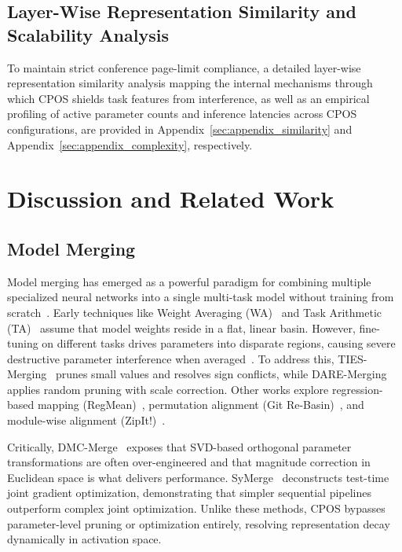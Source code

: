 \documentclass{article}
\theoremstyle{plain}
\theoremstyle{definition}
\theoremstyle{remark}
\begin{document}
\subsection{Layer-Wise Representation Similarity and Scalability Analysis}
\label{subsec:similarity_scalability_pointer}
To maintain strict conference page-limit compliance, a detailed layer-wise representation similarity analysis mapping the internal mechanisms through which CPOS shields task features from interference, as well as an empirical profiling of active parameter counts and inference latencies across CPOS configurations, are provided in Appendix~\ref{sec:appendix_similarity} and Appendix~\ref{sec:appendix_complexity}, respectively.

\section{Discussion and Related Work}
\label{sec:related}

\subsection{Model Merging}
Model merging has emerged as a powerful paradigm for combining multiple specialized neural networks into a single multi-task model without training from scratch~\cite{matena2022merging,ilharco2022editing}. Early techniques like Weight Averaging (WA)~\cite{izmailov2018averaging} and Task Arithmetic (TA)~\cite{ilharco2022editing} assume that model weights reside in a flat, linear basin. However, fine-tuning on different tasks drives parameters into disparate regions, causing severe destructive parameter interference when averaged~\cite{yadav2023resolving}. To address this, TIES-Merging~\cite{yadav2023resolving} prunes small values and resolves sign conflicts, while DARE-Merging~\cite{yu2024language} applies random pruning with scale correction. Other works explore regression-based mapping (RegMean)~\cite{jin2023regmean}, permutation alignment (Git Re-Basin)~\cite{ainsworth2023git}, and module-wise alignment (ZipIt!)~\cite{stoica2024zipit}.

Critically, DMC-Merge~\cite{dmcmerge2025} exposes that SVD-based orthogonal parameter transformations are often over-engineered and that magnitude correction in Euclidean space is what delivers performance. SyMerge~\cite{symerge2025} deconstructs test-time joint gradient optimization, demonstrating that simpler sequential pipelines outperform complex joint optimization. Unlike these methods, CPOS bypasses parameter-level pruning or optimization entirely, resolving representation decay dynamically in activation space.
\end{document}
